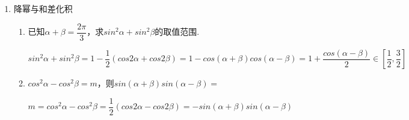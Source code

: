 \begin{enumerate}
\begin{enumerate}
\begin{jieda}
\begin{enumerate}
        \end{enumerate}
        \end{jieda}
    \end{enumerate}
    \item 降幂与和差化积
    \begin{enumerate}
        \item 已知$\alpha + \beta = \dfrac{2\pi}{3}$，求$sin^2\alpha + sin^2\beta$的取值范围.
        \begin{jieda}
            $sin^2\alpha + sin^2\beta = 1 - \dfrac{1}{2}(cos2\alpha + cos2\beta) = 1 - cos(\alpha + \beta)cos(\alpha - \beta) = 1 + \dfrac{cos(\alpha - \beta)}{2} \in [\dfrac{1}{2}, \dfrac{3}{2}]$
        \end{jieda}
        \item $cos^2\alpha - cos^2\beta = m$，则$sin(\alpha+\beta)sin(\alpha - \beta) = $
        \begin{jieda}
            $m = cos^2\alpha - cos^2\beta = \dfrac{1}{2}(cos2\alpha - cos2\beta) = -sin(\alpha+\beta)sin(\alpha-\beta)$
        \end{jieda}
    \end{enumerate}


\end{enumerate}
